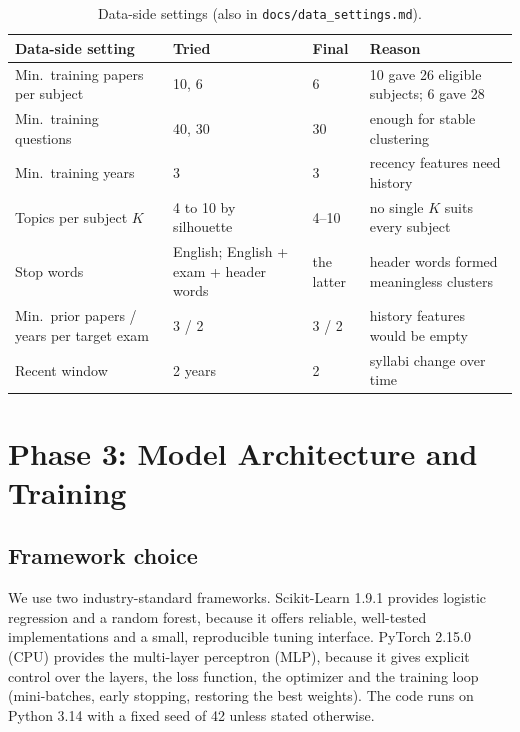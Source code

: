 \documentclass[11pt,a4paper]{article}
\begin{document}
\begin{table}[!htb]
\centering
\small
\begin{tabular}{p{4.0cm}p{2.9cm}p{1.5cm}p{5.7cm}}
\toprule
Data-side setting & Tried & Final & Reason \\
\midrule
Min.\ training papers per subject & 10, 6 & 6 & 10 gave 26 eligible subjects; 6 gave 28 \\
Min.\ training questions & 40, 30 & 30 & enough for stable clustering \\
Min.\ training years & 3 & 3 & recency features need history \\
Topics per subject $K$ & 4 to 10 by silhouette & 4--10 & no single $K$ suits every subject \\
Stop words & English; English + exam + header words & the latter & header words formed meaningless clusters \\
Min.\ prior papers / years per target exam & 3 / 2 & 3 / 2 & history features would be empty \\
Recent window & 2 years & 2 & syllabi change over time \\
\bottomrule
\end{tabular}
\caption{Data-side settings (also in \texttt{docs/data\_settings.md}).}
\label{tab:datasettings}
\end{table}

\section{Phase 3: Model Architecture and Training}
\label{sec:models}

\subsection{Framework choice}
\label{sec:framework}
We use two industry-standard frameworks. Scikit-Learn 1.9.1 provides logistic regression and a random forest, because
it offers reliable, well-tested implementations and a small, reproducible tuning interface. PyTorch 2.15.0 (CPU) provides
the multi-layer perceptron (MLP), because it gives explicit control over the layers, the loss function, the optimizer
and the training loop (mini-batches, early stopping, restoring the best weights). The code runs on Python 3.14 with a
fixed seed of 42 unless stated otherwise.
\end{document}
